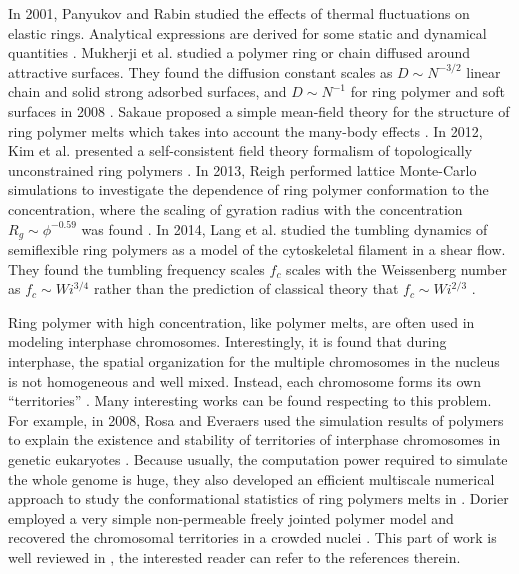 In 2001, Panyukov and Rabin studied the effects of thermal fluctuations on elastic rings. Analytical expressions are derived for some static and dynamical quantities \cite{Panyukov2001}.  Mukherji et al. studied a polymer ring or chain diffused around attractive surfaces. They found the diffusion constant scales as $D \sim N^{-3/2}$ linear chain and solid strong adsorbed surfaces, and $D\sim N^{-1}$ for ring polymer and soft surfaces in 2008 \cite{Mukherji2008}. Sakaue proposed a simple mean-field theory for the structure of ring polymer melts which takes into account the many-body effects \cite{Sakaue2011,Sakaue2012}. In 2012, Kim et al. presented a self-consistent field theory formalism of topologically unconstrained ring polymers \cite{Kim2012}.  In 2013, Reigh performed lattice Monte-Carlo simulations to investigate the dependence of ring polymer conformation to the concentration, where the scaling of gyration radius with the concentration $R_g \sim \phi^{-0.59}$ was found \cite{Reigh2013}. In 2014, Lang et al. studied the tumbling dynamics of semiflexible ring polymers as a model of the cytoskeletal filament in a shear flow. They found the tumbling frequency scales $f_c$ scales with the Weissenberg number as $f_c \sim Wi^{3/4}$ rather than the prediction of classical theory that $f_c \sim Wi^{2/3}$ \cite{Lang2014b}.

Ring polymer with high concentration, like polymer melts, are often used in modeling interphase chromosomes. Interestingly, it is found that during interphase, the spatial organization for the multiple chromosomes in the nucleus is not homogeneous and well mixed. Instead, each chromosome forms its own ``territories'' \cite{Halverson2014}. Many interesting works can be found respecting to this problem. For example, in 2008, Rosa and Everaers used the simulation results of polymers to explain the existence and stability of territories of interphase chromosomes in genetic eukaryotes \cite{Rosa2008}. Because usually, the computation power required to simulate the whole genome is huge, they also developed an efficient multiscale numerical approach to study the conformational statistics of ring polymers melts in \cite{Rosa2014b}.  Dorier employed a very simple non-permeable freely jointed polymer model and recovered the chromosomal territories in a crowded nuclei \cite{Dorier2009}. This part of work is well reviewed in \cite{Halverson2014}, the interested reader can refer to the references therein. 

